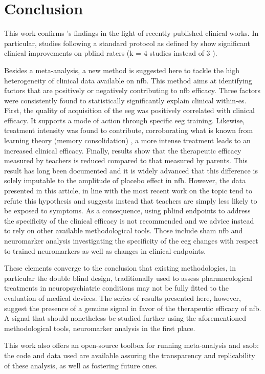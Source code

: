 

\section{Conclusion}

This work confirms \citet{Cortese2016}'s findings in the light of recently published clinical works.
In particular, studies following a standard protocol as defined by \citet{Arns2014} show significant 
clinical improvements on \gls{pblind} raters (k = 4 studies instead of 3 \citet{Cortese2016}).

Besides a meta-analysis, a new method is suggested here to tackle the high heterogeneity of clinical data 
available on \gls{nfb}. This method aims at identifying factors that are positively or negatively contributing 
to \gls{nfb} efficacy. Three factors were consistently found to statistically significantly explain clinical 
within-\gls{es}. First, the quality of acquisition of the \gls{eeg} was positively correlated with clinical 
efficacy. It supports a mode of action through specific \gls{eeg} training. Likewise, treatment intensity was 
found to contribute, corroborating what is known from learning theory (memory consolidation) \citep{Mowrer1960}, 
a more intense treatment leads to an increased clinical efficacy. Finally, results show that the therapeutic 
efficacy measured by teachers is reduced compared to that measured by parents. This result has long been documented 
and it is widely advanced that this difference is solely imputable to the amplitude of placebo effect in \gls{nfb}. 
However, the data presented in this article, in line with the most recent work on the topic \citep{Sollie2013, Narad2015, Minder2018} 
tend to refute this hypothesis and suggests instead that teachers are simply less likely to be exposed to symptoms. 
As a consequence, using \gls{pblind} endpoints to address the specificity of the clinical efficacy is not recommended 
and we advice instead to rely on other available methodological tools. Those include sham \gls{nfb} and neuromarker 
analysis investigating the specificity of the \gls{eeg} changes with respect to trained neuromarkers as well as changes 
in clinical endpoints.

These elements converge to the conclusion that existing methodologies, in particular the double blind design, 
traditionally used to assess pharmacological treatments 
in neuropsychiatric conditions may not be fully fitted to the evaluation of medical devices. The series of results presented 
here, however, suggest the presence of a genuine signal in favor of the therapeutic efficacy of \gls{nfb}. A signal that 
should nonetheless be studied further using the aforementioned methodological tools, neuromarker analysis in the first place.

This work also offers an open-source toolbox for running meta-analysis and \gls{saob}: the code and data used are available 
assuring the transparency and replicability of these analysis, as well as fostering future ones. 

